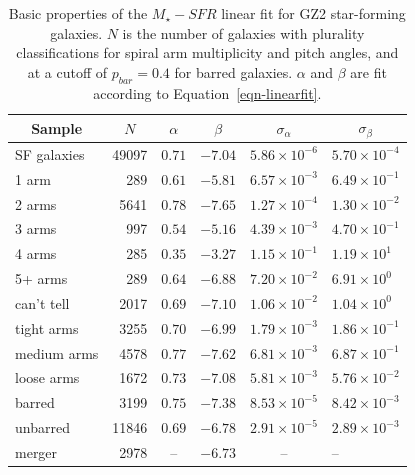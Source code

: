 \documentclass[useAMS,usenatbib]{mn2e}
\begin{document}
\begin{table} 
 \begin{tabular}{@{}lrcrcl}
 \hline
\multicolumn{1}{c}{Sample} &
\multicolumn{1}{c}{$N$} &
\multicolumn{1}{c}{$\alpha$} &
\multicolumn{1}{c}{$\beta$} &
\multicolumn{1}{c}{$\sigma_\alpha$} &
\multicolumn{1}{c}{$\sigma_\beta$} 
\\ 
\hline
\hline						
SF galaxies  & 49097  & $0.71$  & $-7.04$   & $5.86\times10^{-6}$  & $5.70\times10^{-4}$  \\
\hline
1 arm        & 289    & $0.61$  & $-5.81$  &  $6.57\times10^{-3}$  & $6.49\times10^{-1}$  \\
2 arms       & 5641   & $0.78$  & $-7.65$  &  $1.27\times10^{-4}$  & $1.30\times10^{-2}$  \\
3 arms       & 997    & $0.54$  & $-5.16$  &  $4.39\times10^{-3}$  & $4.70\times10^{-1}$  \\
4 arms       & 285    & $0.35$  & $-3.27$  &  $1.15\times10^{-1}$  & $1.19\times10^{ 1}$  \\
5+ arms      & 289    & $0.64$  & $-6.88$  &  $7.20\times10^{-2}$  & $6.91\times10^{0 }$  \\
can't tell   & 2017   & $0.69$  & $-7.10$  &  $1.06\times10^{-2}$  & $1.04\times10^{0 }$  \\
\hline
tight arms   &  3255  & $0.70$  & $-6.99$  &  $1.79\times10^{-3}$  & $1.86\times10^{-1}$  \\
medium arms  &  4578  & $0.77$  & $-7.62$  &  $6.81\times10^{-3}$  & $6.87\times10^{-1}$  \\
loose arms   &  1672  & $0.73$  & $-7.08$  &  $5.81\times10^{-3}$  & $5.76\times10^{-2}$  \\
\hline
barred       &  3199  & $0.75$  & $-7.38$  &  $8.53\times10^{-5}$  & $8.42\times10^{-3}$  \\
unbarred     &  11846 & $0.69$  & $-6.78$  &  $2.91\times10^{-5}$  & $2.89\times10^{-3}$  \\
\hline
merger       &  2978  & --      & $-6.73$  &  --                   & --                   \\
\hline
 \end{tabular}
\caption{Basic properties of the $M_\star-SFR$ linear fit for GZ2 star-forming galaxies. $N$ is the number of galaxies with plurality classifications for spiral arm multiplicity and pitch angles, and at a cutoff of $p_{bar}=0.4$ for barred galaxies. $\alpha$ and $\beta$ are fit according to Equation~\ref{eqn-linearfit}.\label{tbl-fits}}
\end{table}
\end{document}

